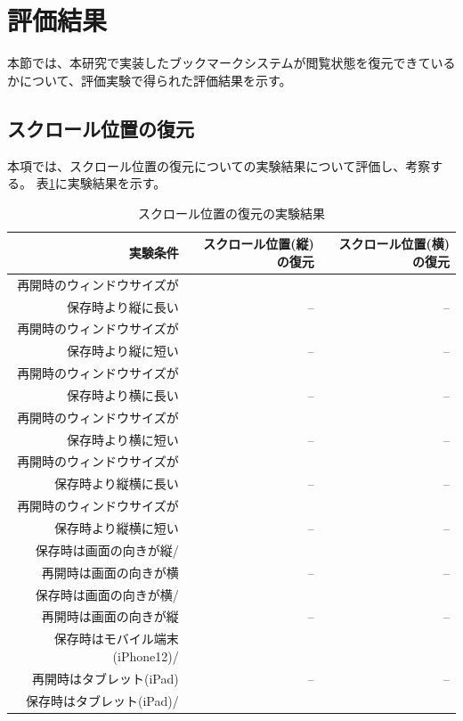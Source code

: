 \section{評価結果}
本節では、本研究で実装したブックマークシステムが閲覧状態を復元できているかについて、評価実験で得られた評価結果を示す。

\subsection{スクロール位置の復元}
本項では、スクロール位置の復元についての実験結果について評価し、考察する。
表\ref{tb:evl-result-scroll-position}に実験結果を示す。

\begin{table}[htbp]
  \caption{スクロール位置の復元の実験結果}
  \label{tb:evl-result-scroll-position}
  \begin{center}
    \begin{tabular}{rrr}
      \hline
      実験条件 & スクロール位置(縦)の復元 & スクロール位置(横)の復元 \\ \hline \hline
      再開時のウィンドウサイズが\\
      保存時より縦に長い & -- & -- \\ \hline
      再開時のウィンドウサイズが\\
      保存時より縦に短い & -- & -- \\ \hline
      再開時のウィンドウサイズが\\
      保存時より横に長い & -- & -- \\ \hline
      再開時のウィンドウサイズが\\
      保存時より横に短い & -- & -- \\ \hline
      再開時のウィンドウサイズが\\
      保存時より縦横に長い & -- & -- \\ \hline
      再開時のウィンドウサイズが\\
      保存時より縦横に短い & -- & -- \\ \hline
      保存時は画面の向きが縦/\\
      再開時は画面の向きが横 & -- & -- \\ \hline
      保存時は画面の向きが横/\\
      再開時は画面の向きが縦 & -- & -- \\ \hline
      保存時はモバイル端末(iPhone12)/\\
      再開時はタブレット(iPad) & -- & -- \\ \hline
      保存時はタブレット(iPad)/\\

\end{tabular}
\end{center}
\end{table}
